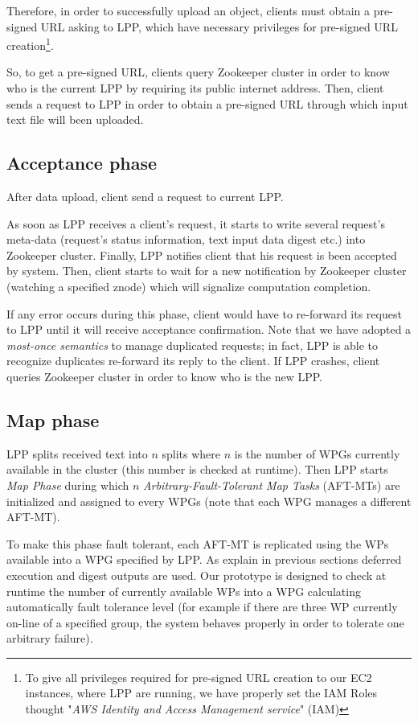 \documentclass[sigchi]{acmart}
\begin{document}
Therefore, in order to successfully upload an object, clients must obtain a pre-signed URL asking to LPP, which  have necessary privileges for pre-signed URL creation\footnote{To give all privileges required for pre-signed URL creation to our EC2 instances, where LPP are running, we have properly set the IAM Roles thought "\textit{AWS Identity and Access Management service}" (IAM)}.
 
So, to get a pre-signed URL, clients query Zookeeper cluster in order to know who is the current LPP by requiring its public internet address. Then, client sends a request to LPP in order to obtain a pre-signed URL through which input text file will been uploaded. 

\subsection{Acceptance phase}

After data upload, client send a request to current LPP. 

As soon as LPP receives a client's request, it starts to write several request's meta-data (request's status information, text input data digest etc.) into Zookeeper cluster. Finally, LPP notifies client that his request is been accepted by system. Then, client starts to wait for a new notification by Zookeeper cluster (watching a specified znode) which will signalize computation completion.

If any error occurs during this phase, client would have to re-forward its request to LPP until it will receive acceptance confirmation. Note that we have adopted a \textit{most-once semantics} to manage duplicated requests; in fact, LPP is able to recognize duplicates re-forward its reply to the client. If LPP crashes, client queries Zookeeper cluster in order to know who is the new LPP.

\subsection{Map phase}

LPP splits received text into $n$ splits where $n$ is the number of WPGs currently available in the cluster (this number is checked at runtime). Then LPP starts \textit{Map Phase} during which $n$ \textit{Arbitrary-Fault-Tolerant Map Tasks} (AFT-MTs) are initialized and assigned to every WPGs (note that each WPG manages a different AFT-MT). 

To make this phase fault tolerant, each AFT-MT is replicated using the WPs available into a WPG specified by LPP. As explain in previous sections deferred execution and digest outputs are used. Our prototype is designed to check at runtime the number of currently available WPs into a WPG calculating automatically fault tolerance level (for example if there are three WP currently on-line of a specified group, the system behaves properly in order to tolerate one arbitrary failure).
\end{document}
